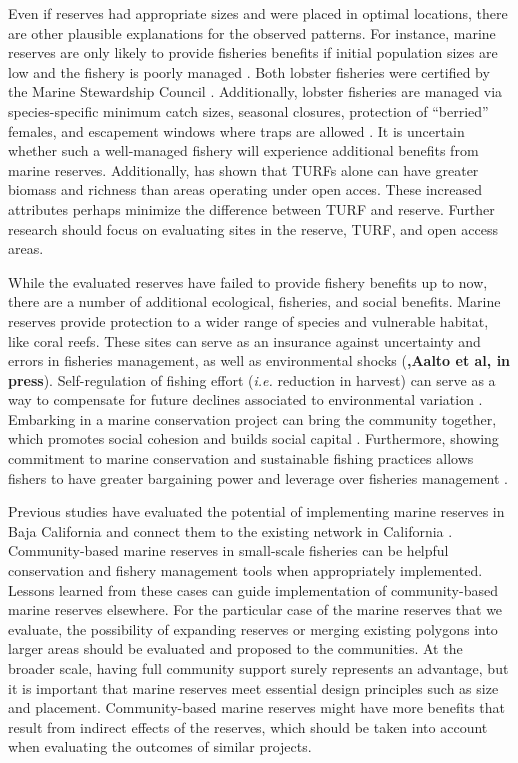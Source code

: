 \documentclass{frontiersSCNS}
\theoremstyle{definition}
\theoremstyle{definition}
\theoremstyle{definition}
\theoremstyle{remark}
\begin{document}
Even if reserves had appropriate sizes and were placed in optimal
locations, there are other plausible explanations for the observed
patterns. For instance, marine reserves are only likely to provide
fisheries benefits if initial population sizes are low and the fishery
is poorly managed \citep{hilborn_2006}. Both lobster fisheries were
certified by the Marine Stewardship Council \citep{prezramrez_2016-J1}.
Additionally, lobster fisheries are managed via species-specific minimum
catch sizes, seasonal closures, protection of ``berried'' females, and
escapement windows where traps are allowed \citep{dof_website_1993}. It
is uncertain whether such a well-managed fishery will experience
additional benefits from marine reserves. Additionally,
\citet{gelcich_2008} has shown that TURFs alone can have greater biomass
and richness than areas operating under open acces. These increased
attributes perhaps minimize the difference between TURF and reserve.
Further research should focus on evaluating sites in the reserve, TURF,
and open access areas.

While the evaluated reserves have failed to provide fishery benefits up
to now, there are a number of additional ecological, fisheries, and
social benefits. Marine reserves provide protection to a wider range of
species and vulnerable habitat, like coral reefs. These sites can serve
as an insurance against uncertainty and errors in fisheries management,
as well as environmental shocks
\citep{hilborn_2004,hilborn_2006,micheli_2012-EU} (\textbf{,Aalto et al,
in press}). Self-regulation of fishing effort (\emph{i.e.} reduction in
harvest) can serve as a way to compensate for future declines associated
to environmental variation \citep{finkbeiner_2018}. Embarking in a
marine conservation project can bring the community together, which
promotes social cohesion and builds social capital \citep{fulton_2019}.
Furthermore, showing commitment to marine conservation and sustainable
fishing practices allows fishers to have greater bargaining power and
leverage over fisheries management \citep{prezramrez_2012}.

Previous studies have evaluated the potential of implementing marine
reserves in Baja California and connect them to the existing network in
California \citep{arafehdalmau_2017}. Community-based marine reserves in
small-scale fisheries can be helpful conservation and fishery management
tools when appropriately implemented. Lessons learned from these cases
can guide implementation of community-based marine reserves elsewhere.
For the particular case of the marine reserves that we evaluate, the
possibility of expanding reserves or merging existing polygons into
larger areas should be evaluated and proposed to the communities. At the
broader scale, having full community support surely represents an
advantage, but it is important that marine reserves meet essential
design principles such as size and placement. Community-based marine
reserves might have more benefits that result from indirect effects of
the reserves, which should be taken into account when evaluating the
outcomes of similar projects.
\end{document}
